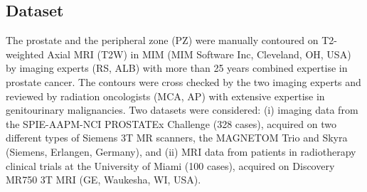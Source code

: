 \subsection{Dataset}
\label{subsec:dataset}
The prostate and the peripheral zone (PZ) were manually
contoured on T2-weighted Axial MRI (T2W) in MIM (MIM Software Inc,
Cleveland, OH, USA) by imaging experts (RS, ALB) with more than
25 years combined expertise in prostate cancer. The contours were cross
checked by the two imaging experts and reviewed by radiation
oncologists (MCA, AP) with extensive expertise in genitourinary
malignancies. Two datasets were considered: (i) imaging data from the
SPIE-AAPM-NCI PROSTATEx Challenge \cite{deukwoo_classification_2018} (328 cases), 
acquired on two different types of Siemens 3T MR scanners, the MAGNETOM Trio
and Skyra (Siemens, Erlangen, Germany), and  (ii) MRI data from
patients in radiotherapy clinical trials at the University of Miami (100 cases),
acquired on Discovery MR750 3T MRI (GE, Waukesha, WI, USA).

